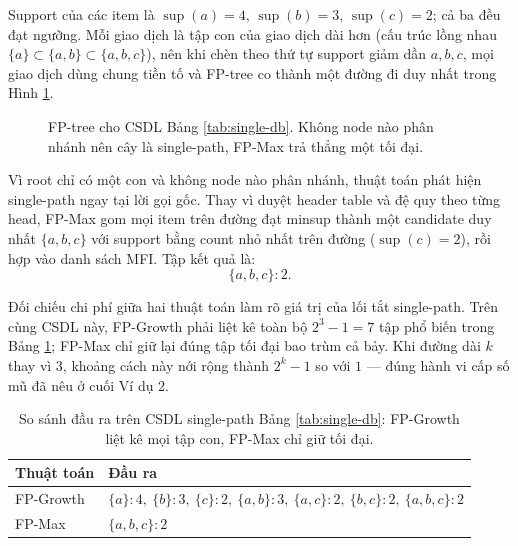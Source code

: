 Support của các item là $\operatorname{sup}(a)=4$, $\operatorname{sup}(b)=3$, $\operatorname{sup}(c)=2$; cả ba đều đạt ngưỡng. Mỗi giao dịch là tập con của giao dịch dài hơn (cấu trúc lồng nhau $\{a\}\subset\{a,b\}\subset\{a,b,c\}$), nên khi chèn theo thứ tự support giảm dần $a,b,c$, mọi giao dịch dùng chung tiền tố và FP-tree co thành một đường đi duy nhất trong Hình \ref{fig:fptree-single}.

\begin{figure}[H]
    \centering
    \caption{FP-tree cho CSDL Bảng \ref{tab:single-db}. Không node nào phân nhánh nên cây là single-path, FP-Max trả thẳng một tối đại.}
    \label{fig:fptree-single}
\end{figure}

Vì root chỉ có một con và không node nào phân nhánh, thuật toán phát hiện single-path ngay tại lời gọi gốc. Thay vì duyệt header table và đệ quy theo từng head, FP-Max gom mọi item trên đường đạt minsup thành một candidate duy nhất $\{a,b,c\}$ với support bằng count nhỏ nhất trên đường ($\operatorname{sup}(c)=2$), rồi hợp vào danh sách MFI. Tập kết quả là:
\[
    \{a,b,c\}:2.
\]

Đối chiếu chi phí giữa hai thuật toán làm rõ giá trị của lối tắt single-path. Trên cùng CSDL này, FP-Growth phải liệt kê toàn bộ $2^3-1=7$ tập phổ biến trong Bảng \ref{tab:single-compare}; FP-Max chỉ giữ lại đúng tập tối đại bao trùm cả bảy. Khi đường dài $k$ thay vì $3$, khoảng cách này nới rộng thành $2^k-1$ so với $1$ --- đúng hành vi cấp số mũ đã nêu ở cuối Ví dụ 2.

\begin{table}[H]
    \centering
    \caption{So sánh đầu ra trên CSDL single-path Bảng \ref{tab:single-db}: FP-Growth liệt kê mọi tập con, FP-Max chỉ giữ tối đại.}
    \label{tab:single-compare}
    \begin{tabular}{l l}
        \toprule
        Thuật toán & Đầu ra \\
        \midrule
        FP-Growth & $\{a\}:4,\ \{b\}:3,\ \{c\}:2,\ \{a,b\}:3,\ \{a,c\}:2,\ \{b,c\}:2,\ \{a,b,c\}:2$ \\
        FP-Max & $\{a,b,c\}:2$ \\
        \bottomrule
    \end{tabular}
\end{table}
